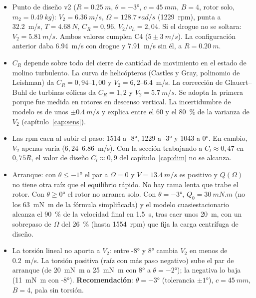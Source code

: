 \begin{resultado}
\begin{itemize}
  \item Punto de diseño v2 ($R=\SI{0.25}{m}$, $\theta=\ang{-3}$, $c=\SI{45}{mm}$, $B=4$, rotor
        solo, $m_2=\SI{0.49}{kg}$): $V_2=\SI{6.36}{m/s}$, $\Omega=\SI{128.7}{rad/s}$
        (\num{1229}~rpm), punta a \SI{32.2}{m/s}, $T=\SI{4.68}{N}$, $C_R=0{,}96$,
        $V_2/v_h=2{,}04$. Si el drogue no se soltara: $V_2=\SI{5.81}{m/s}$. Ambos valores cumplen
        C4 ($5\pm\SI{3}{m/s}$). La configuración anterior daba \SI{6.94}{m/s} con drogue y
        \SI{7.91}{m/s} sin él, a $R=\SI{0.20}{m}$.
  \item $C_R$ depende sobre todo del cierre de cantidad de movimiento en el estado de
        molino turbulento. La curva de helicópteros (Castles y Gray, polinomio de
        Leishman) da $C_R=0{,}94$--$1{,}00$ y $V_2=6{,}2$--\SI{6.4}{m/s}. La corrección
        de Glauert--Buhl de turbinas eólicas da $C_R=1{,}2$ y $V_2=\SI{5.7}{m/s}$. Se adopta la
        primera porque fue medida en rotores en descenso vertical. La incertidumbre de modelo
        es de unos $\pm\SI{0.4}{m/s}$ y explica entre el 60 y el \SI{80}{\percent} de la varianza
        de $V_2$ (capítulo~\ref{cap:sens}).
  \item Las rpm caen al subir el paso: \num{1514} a \ang{-8}, \num{1229} a \ang{-3} y
        \num{1043} a \ang{0}. En cambio, $V_2$ apenas varía ($6{,}24$--\SI{6.86}{m/s}).
        Con la sección trabajando a $C_l\approx0{,}47$ en $0{,}75R$, el valor de diseño
        $C_l\approx0{,}9$ del capítulo~\ref{cap:dim} no se alcanza.
  \item Arranque: con $\theta\le\ang{-1}$ el par a $\Omega=0$ y $V=\SI{13.4}{m/s}$ es
        positivo y $Q(\Omega)$ no tiene otra raíz que el equilibrio rápido. No hay rama
        lenta que trabe el rotor. Con $\theta\ge\ang{0}$ el rotor no arranca solo. Con
        $\theta=\ang{-3}$, $Q_0=\SI{30}{mN.m}$ (no los \SI{63}{mN.m} de la fórmula
        simplificada) y el modelo cuasiestacionario alcanza el \SI{90}{\percent} de la
        velocidad final en \SI{1.5}{s}, tras caer unos \SI{20}{m}, con un sobrepaso de
        $\Omega$ del \SI{26}{\percent} (hasta \num{1554}~rpm) que fija la carga centrífuga
        de diseño.
  \item La torsión lineal no aporta a $V_2$: entre \ang{-8} y \ang{+8} cambia $V_2$ en menos
        de \SI{0.2}{m/s}. La torsión positiva (raíz con más paso negativo) sube el par de
        arranque (de \SI{20}{mN.m} a \SI{25}{mN.m} con \ang{+8} a $\theta=\ang{-2}$); la
        negativa lo baja (\SI{11}{mN.m} con \ang{-8}). \textbf{Recomendación}:
        $\theta=\ang{-3}$ (tolerancia $\pm\ang{1}$), $c=\SI{45}{mm}$, $B=4$, pala sin torsión.
\end{itemize}
\end{resultado}

